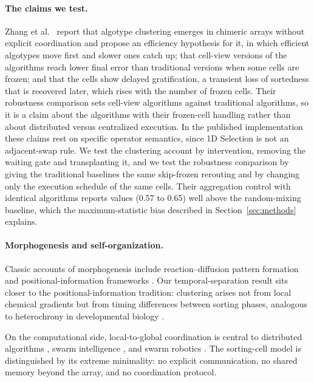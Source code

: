 \documentclass[11pt]{article}
\begin{document}
\paragraph{The claims we test.}
Zhang et al.\ \cite{zhang2024classical} report that algotype clustering emerges in chimeric arrays
without explicit coordination and propose an efficiency hypothesis for it, in which efficient
algotypes move first and slower ones catch up; that cell-view versions of the algorithms reach
lower final error than traditional versions when some cells are frozen; and that the cells show
delayed gratification, a transient loss of sortedness that is recovered later, which rises with
the number of frozen cells. Their robustness comparison sets cell-view algorithms against
traditional algorithms, so it is a claim about the algorithms with their frozen-cell handling
rather than about distributed versus centralized execution. In the published implementation these
claims rest on specific operator semantics, since 1D Selection is not an adjacent-swap rule. We
test the clustering account by intervention, removing the waiting gate and transplanting it, and
we test the robustness comparison by giving the traditional baselines the same skip-frozen
rerouting and by changing only the execution schedule of the same cells. Their aggregation control
with identical algorithms reports values (0.57 to 0.65) well above the random-mixing baseline,
which the maximum-statistic bias described in Section~\ref{sec:methods} explains.

\paragraph{Morphogenesis and self-organization.}
Classic accounts of morphogenesis include reaction--diffusion pattern formation
\cite{turing1952chemical} and positional-information frameworks \cite{wolpert1969positional}.
Our temporal-separation result sits closer to the positional-information tradition: clustering
arises not from local chemical gradients but from timing differences between sorting phases,
analogous to heterochrony in developmental biology \cite{gould1977ontogeny}.

On the computational side, local-to-global coordination is central to distributed algorithms
\cite{lynch1996distributed}, swarm intelligence \cite{bonabeau1999swarm,couzin2009collective},
and swarm robotics \cite{rubenstein2014programmable,werfel2014designing}. The sorting-cell model is
distinguished by its extreme minimality: no explicit communication, no shared memory beyond the
array, and no coordination protocol.
\end{document}
